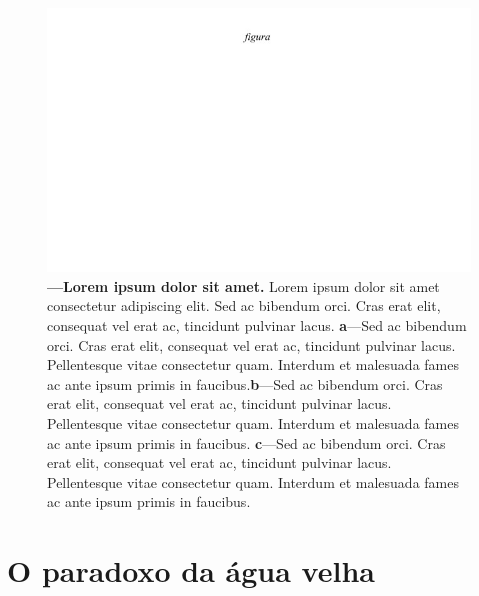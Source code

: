 \documentclass[./main.tex]{subfiles}
\begin{document}
\begin{figure}[t!] 
\centering				
\includegraphics[width=0.95\linewidth]{figs/fig_m.jpg}		
\caption[Lorem ipsum dolor sit amet]
{\textbf{---\;Lorem ipsum dolor sit amet.}
    Lorem ipsum dolor sit amet consectetur adipiscing elit. Sed ac bibendum orci. Cras erat elit, consequat vel erat ac, tincidunt pulvinar lacus. \;\textbf{a}\;---\;Sed ac bibendum orci. Cras erat elit, consequat vel erat ac, tincidunt pulvinar lacus. Pellentesque vitae consectetur quam. Interdum et malesuada fames ac ante ipsum primis in faucibus.\;\textbf{b}\;---\;Sed ac bibendum orci. Cras erat elit, consequat vel erat ac, tincidunt pulvinar lacus. Pellentesque vitae consectetur quam. Interdum et malesuada fames ac ante ipsum primis in faucibus. \;\textbf{c}\;---\;Sed ac bibendum orci. Cras erat elit, consequat vel erat ac, tincidunt pulvinar lacus. Pellentesque vitae consectetur quam. Interdum et malesuada fames ac ante ipsum primis in faucibus.
}
\label{fig:hydro:topo} 		
\end{figure}

\section{O paradoxo da água velha}

\end{document}
